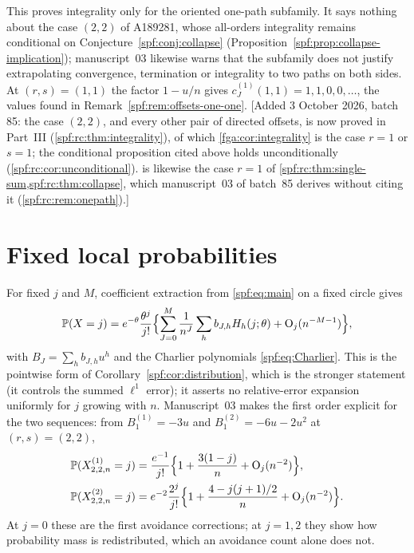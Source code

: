 \documentclass[11pt]{article}
\numberwithin{equation}{section}
\theoremstyle{definition}
\theoremstyle{remark}
\theoremstyle{definition}
\newcommand{\Pp}{\mathbb P}
\newcommand{\bigO}{\mathrm O}
\begin{document}
This proves integrality only for the oriented one-path subfamily. It says
nothing about the case $(2,2)$ of A189281, whose all-orders integrality
remains conditional on Conjecture~\ref{spf:conj:collapse}
(Proposition~\ref{spf:prop:collapse-implication}); manuscript~03 likewise warns that
the subfamily does not justify extrapolating convergence, termination or
integrality to two paths on both sides. At $(r,s)=(1,1)$ the factor
$1-u/n$ gives $c_J^{(1)}(1,1)=1,1,0,0,\ldots$, the values found in
Remark~\ref{spf:rem:offsets-one-one}.
[Added 3 October 2026, batch 85: the case $(2,2)$, and every other pair of
directed offsets, is now proved in Part~III (\cref{spf:rc:thm:integrality}),
of which \cref{fga:cor:integrality} is the case $r=1$ or $s=1$; the
conditional proposition cited above holds unconditionally
(\cref{spf:rc:cor:unconditional}).  is likewise the
case $r=1$ of \cref{spf:rc:thm:single-sum,spf:rc:thm:collapse}, which
manuscript~03 of batch~85 derives without citing it
(\cref{spf:rc:rem:onepath}).]

\section{Fixed local probabilities}
\label{fga:sec:local}

For fixed $j$ and $M$, coefficient extraction from \eqref{spf:eq:main} on a
fixed circle gives
\begin{equation}
 \Pp(X=j)=e^{-\theta}\frac{\theta^j}{j!}\Bigl\{\sum_{J=0}^M\frac1{n^J}
 \sum_hb_{J,h}H_h(j;\theta)+\bigO_j(n^{-M-1})\Bigr\},
 \label{fga:eq:localall}
\end{equation}
with $B_J=\sum_hb_{J,h}u^h$ and the Charlier polynomials
\eqref{spf:eq:Charlier}. This is the pointwise form of
Corollary~\ref{spf:cor:distribution}, which is the stronger statement (it controls
the summed $\ell^1$ error); it asserts no relative-error expansion
uniformly for $j$ growing with $n$. Manuscript~03 makes the first order
explicit for the two sequences: from $B_1^{(1)}=-3u$ and
$B_1^{(2)}=-6u-2u^2$ at $(r,s)=(2,2)$,
\begin{align}
 \Pp(X^{(1)}_{2,2,n}=j)&=\frac{e^{-1}}{j!}
 \Bigl\{1+\frac{3(1-j)}n+\bigO_j(n^{-2})\Bigr\},
 \label{fga:eq:localdirect}\\
 \Pp(X^{(2)}_{2,2,n}=j)&=e^{-2}\frac{2^j}{j!}
 \Bigl\{1+\frac{4-j(j+1)/2}n+\bigO_j(n^{-2})\Bigr\}.
 \label{fga:eq:localabsolute}
\end{align}
At $j=0$ these are the first avoidance corrections; at $j=1,2$ they show
how probability mass is redistributed, which an avoidance count alone does
not.
\end{document}
